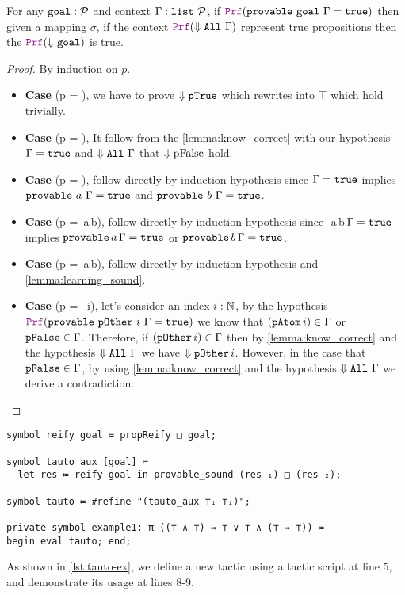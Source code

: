 \begin{theorem}
For any $\texttt{\upshape{goal}}: \mathcal{P}$ and context $\Gamma: \texttt{list}~\mathcal{P}$, if $\prf (\kw{provable}~\kw{goal}~\hyps = \true)$
then given a mapping $\sigma$, if the context $\prf (\deno{\kw{All}~\hyps})$ represent true propositions then the $\prf (\deno{\kw{goal}})$ is true.
\begin{proof} By induction on $p$.
\begin{itemize}
\item[] \textbf{Case} (p = ), we have to prove $\Downarrow \texttt{\upshape{pTrue}}$ which rewrites into $\top$ which hold trivially.
\item[] \textbf{Case} (p = ), It follow from the \cref{lemma:know_correct} with our hypothesis   $\Gamma = \texttt{\upshape{true}}$ and $\Downarrow \texttt{\upshape{All}}~\Gamma$ that $\Downarrow \text{pFalse}$ hold.
\item[] \textbf{Case} (p = ), follow directly by induction hypothesis since   $\Gamma = \texttt{\upshape{true}}$ implies $\texttt{\upshape{provable}}~a~\Gamma = \texttt{\upshape{true}}$ and $\texttt{\upshape{provable}}~b~\Gamma = \texttt{\upshape{true}}$.
\item[] \textbf{Case} (p = \,a\,b), follow directly by induction hypothesis since \,\,a\,b\,$\Gamma = \texttt{\upshape{true}}$ implies $\texttt{\upshape{provable}}\,a\,\Gamma = \texttt{\upshape{true}}$ or $\texttt{\upshape{provable}}\,b\,\Gamma = \texttt{\upshape{true}}$.
\item[] \textbf{Case} (p = \,a\,b), follow directly by induction hypothesis and \cref{lemma:learning_sound}.
\item[] \textbf{Case} (p = ~i), let's consider an index $i: \mathbb{N}$, by the hypothesis $\prf (\kw{provable}~\kw{pOther}~i~\hyps = \true)$  we know that $(\texttt{\upshape{pAtom}}\,i) \in \Gamma$ or $\texttt{\upshape{pFalse}} \in \Gamma$. Therefore,
if $(\texttt{\upshape{pOther}}\,i) \in \Gamma$ then by \cref{lemma:know_correct} and the hypothesis $\Downarrow \texttt{\upshape{All}}~\Gamma$ we have $\Downarrow \texttt{\upshape{pOther}}\,i$. However,
in the case that $\texttt{\upshape{pFalse}} \in \Gamma$, by using \cref{lemma:know_correct} and the hypothesis $\Downarrow \texttt{\upshape{All}}~\Gamma$ we derive a contradiction.
\end{itemize}
\end{proof}
\end{theorem}

\begin{lstlisting}[language=Lambdapi, caption={Usage of Tauto}, label={lst:tauto-ex}]
symbol reify goal ≔ propReify □ goal; 

symbol tauto_aux [goal] ≔
  let res ≔ reify goal in provable_sound (res ₁) □ (res ₂);

symbol tauto ≔ #refine "(tauto_aux ⊤ᵢ ⊤ᵢ)";

private symbol example1: π ((⊤ ∧ ⊤) ⇒ ⊤ ∨ ⊤ ∧ (⊤ ⇒ ⊤)) ≔
begin eval tauto; end;
\end{lstlisting}

As shown in \cref{lst:tauto-ex}, we define a new tactic  using a tactic script at line 5, and demonstrate its usage at lines 8-9.
